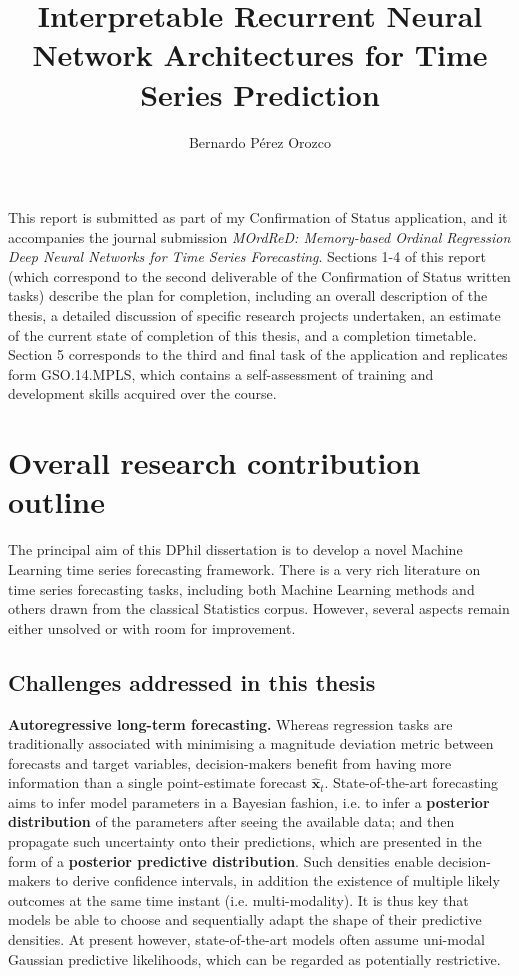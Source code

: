 \documentclass[pdftex,12pt,a4paper]{article}
\title{Interpretable Recurrent Neural Network Architectures for Time Series Prediction}
\author{Bernardo P\'erez Orozco}
\date{}
\theoremstyle{definition}
\theoremstyle{remark}
\begin{document}
\maketitle

This report is submitted as part of my Confirmation of Status application, and it accompanies the journal submission \textit{MOrdReD: Memory-based Ordinal Regression Deep Neural Networks for Time Series Forecasting}. Sections 1-4 of this report (which correspond to the second deliverable of the Confirmation of Status written tasks) describe the plan for completion, including an overall description of the thesis, a detailed discussion of specific research projects undertaken, an estimate of the current state of completion of this thesis, and a completion timetable. Section 5 corresponds to the third and final task of the application and replicates form GSO.14.MPLS, which contains a self-assessment of training and development skills acquired over the course.

\section{Overall research contribution outline}
The principal aim of this DPhil dissertation is to develop a novel Machine Learning time series forecasting framework. There is a very rich literature on time series forecasting tasks, including both Machine Learning methods and others drawn from the classical Statistics corpus. However, several aspects remain either unsolved or with room for improvement.

\subsection{Challenges addressed in this thesis}

\textbf{Autoregressive long-term forecasting.} Whereas regression tasks are traditionally associated with minimising a magnitude deviation metric between forecasts and target variables, decision-makers benefit from having more information than a single point-estimate forecast $\mathbf{\hat{x}}_t$. State-of-the-art forecasting aims to infer model parameters in a Bayesian fashion, i.e. to infer a \textbf{posterior distribution} of the parameters after seeing the available data; and then propagate such uncertainty onto their predictions, which are presented in the form of a \textbf{posterior predictive distribution}. Such densities enable decision-makers to derive confidence intervals, in addition the existence of multiple likely outcomes at the same time instant (i.e. multi-modality). It is thus key that models be able to choose and sequentially adapt the shape of their predictive densities. At present however, state-of-the-art models often assume uni-modal Gaussian predictive likelihoods, which can be regarded as potentially restrictive.
\end{document}
